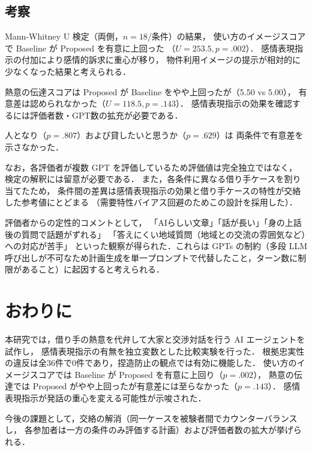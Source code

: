 \documentclass[dvipdfmx]{FITpaper}
\begin{document}
\subsection{考察}

Mann-Whitney U 検定（両側，$n=18$/条件）の結果，
使い方のイメージスコアで Baseline が Proposed を有意に上回った
（$U=253.5, p=.002$）．
感情表現指示の付加により感情的訴求に重心が移り，
物件利用イメージの提示が相対的に少なくなった結果と考えられる．

熱意の伝達スコアは Proposed が Baseline をやや上回ったが（5.50 vs 5.00），
有意差は認められなかった（$U=118.5, p=.143$）．
感情表現指示の効果を確認するには評価者数・GPT数の拡充が必要である．

人となり（$p=.807$）および貸したいと思うか（$p=.629$）は
両条件で有意差を示さなかった．

なお，各評価者が複数 GPT を評価しているため評価値は完全独立ではなく，
検定の解釈には留意が必要である．
また，各条件に異なる借り手ケースを割り当てたため，
条件間の差異は感情表現指示の効果と借り手ケースの特性が交絡した参考値にとどまる
（需要特性バイアス回避のためこの設計を採用した）．

評価者からの定性的コメントとして，
「AIらしい文章」「話が長い」「身の上話後の質問で話題がずれる」
「答えにくい地域質問（地域との交流の雰囲気など）への対応が苦手」
といった観察が得られた．これらは GPTs の制約（多段 LLM 呼び出しが不可なため計画生成を単一プロンプトで代替したこと，ターン数に制限があること）に起因すると考えられる．


\section{おわりに}

本研究では，借り手の熱意を代弁して大家と交渉対話を行う AI エージェントを試作し，
感情表現指示の有無を独立変数とした比較実験を行った．
根拠忠実性の違反は全36件で0件であり，捏造防止の観点では有効に機能した．
使い方のイメージスコアでは Baseline が Proposed を有意に上回り（$p=.002$），
熱意の伝達では Proposed がやや上回ったが有意差には至らなかった（$p=.143$）．
感情表現指示が発話の重心を変える可能性が示唆された．

今後の課題として，交絡の解消（同一ケースを被験者間でカウンターバランスし，
各参加者は一方の条件のみ評価する計画）および評価者数の拡大が挙げられる．




\end{document}
